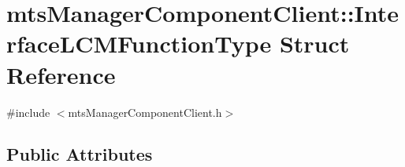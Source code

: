 \hypertarget{structmts_manager_component_client_1_1_interface_l_c_m_function_type}{\section{mts\-Manager\-Component\-Client\-:\-:Interface\-L\-C\-M\-Function\-Type Struct Reference}
\label{structmts_manager_component_client_1_1_interface_l_c_m_function_type}
}


{\ttfamily \#include $<$mts\-Manager\-Component\-Client.\-h$>$}

\subsection*{Public Attributes}
